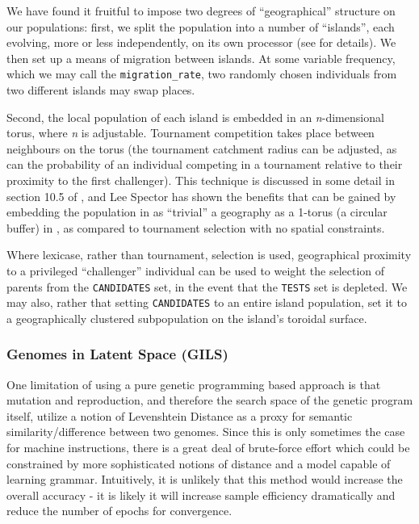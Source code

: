 \documentclass[11pt]{article}
\begin{document}
We have found it fruitful to impose two degrees of ``geographical'' structure on our populations: first, we split the population into a number of ``islands'', each evolving, more or less independently, on its own processor (see \cite{whitley1998island} for details). We then set up a means of migration between islands. At some variable frequency, which we may call the \texttt{migration\_rate}, two randomly chosen individuals from two different islands may swap places.

Second, the local population of each island is embedded in an \emph{n}-dimensional torus, where \emph{n} is adjustable. Tournament competition takes place between neighbours on the torus (the tournament catchment radius can be adjusted, as can the probability of an individual competing in a tournament relative to their proximity to the first challenger). This technique is discussed in some detail in section 10.5 of \cite{poli2008fieldguide}, and Lee Spector has shown the benefits that can be gained by embedding the population in as ``trivial'' a geography as a 1-torus (a circular buffer) in \cite{spector2006}, as compared to tournament selection with no spatial constraints.

Where lexicase, rather than tournament, selection is used, geographical proximity to a privileged ``challenger'' individual can be used to weight the selection of parents from the \texttt{CANDIDATES} set, in the event that the \texttt{TESTS} set is depleted. We may also, rather that setting \texttt{CANDIDATES} to an entire island population, set it to a geographically clustered subpopulation on the island's toroidal surface.


\subsubsection{Genomes in Latent Space (GILS)}
\label{sec:org19cef52}
One limitation of using a pure genetic programming based approach is that mutation and reproduction, and therefore the search space of the genetic program itself, utilize a notion of  Levenshtein Distance as a proxy for semantic similarity/difference between two genomes. Since this is only sometimes the case for machine instructions, there is a great deal of brute-force effort which could be constrained by more sophisticated notions of distance and a model capable of learning grammar. Intuitively, it is unlikely that this method would increase the overall accuracy - it is likely it will increase sample efficiency dramatically and reduce the number of epochs for convergence.
\end{document}
